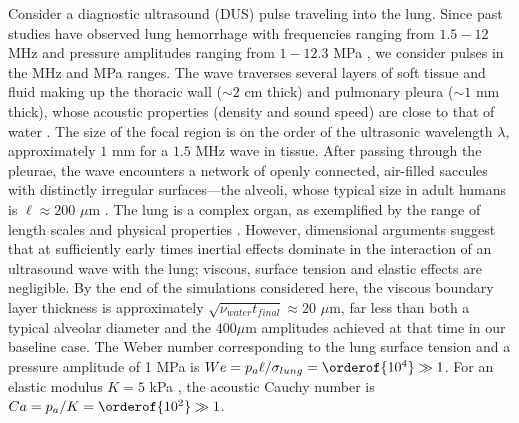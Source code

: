 Consider a diagnostic ultrasound (DUS) pulse traveling into the
lung. Since past studies have observed lung hemorrhage with
frequencies ranging from $1.5-12$ MHz and pressure amplitudes ranging
from $1-12.3$ MPa
\citep{Penney1993a,Child1990,OBrien2000b,Miller2015a}, we consider
pulses in the MHz and MPa ranges.  The wave traverses several layers
of soft tissue and fluid making up the thoracic wall ($\sim 2$ cm
thick) and pulmonary pleura ($\sim 1$ mm thick), whose acoustic
properties (density and sound speed) are close to that of water
\citep{McLean2011}.  The size of the focal region is on the order of
the ultrasonic wavelength $\lambda$, approximately $1$ mm for a $1.5$
MHz wave in tissue.  After passing through the pleurae, the wave
encounters a network of openly connected, air-filled saccules with
distinctly irregular surfaces---the alveoli, whose typical size in
adult humans is $\ell\approx200$ $\mu$m \citep{Ochs2004}.  The lung is
a complex organ, as exemplified by the range of length scales and
physical properties \cite[multiphase, viscoelastic, surface tension,
high gas volume fraction][]{Bayliss1939, Suki1994}.  However,
dimensional arguments suggest that at sufficiently early times
inertial effects dominate in the interaction of an ultrasound wave
with the lung; viscous, surface tension and elastic effects are
negligible. By the end of the simulations considered here, the viscous
boundary layer thickness is approximately
$\sqrt{\nu_{water} t_{final}}\approx 20$ $\mu$m, far less than both a
typical alveolar diameter and the $400 \mu$m amplitudes achieved at
that time in our baseline case.  The Weber number corresponding to the
lung surface tension \cite[ $\sim 9$ mN/m][]{Schurch1976} and a
pressure amplitude of 1 MPa is
$We=p_a\ell/\sigma_{lung}=\orderof{10^4}\gg1$. For an elastic modulus
$K = 5$ kPa \citep{Cavalcante2005}, the acoustic Cauchy number is
$Ca=p_a/K=\orderof{10^2}\gg1$.

